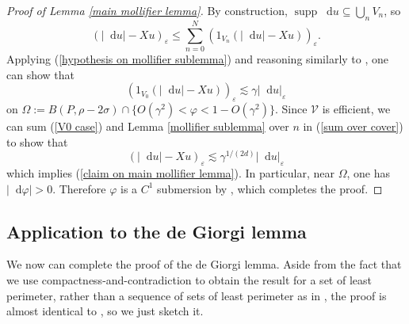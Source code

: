 \documentclass[reqno,11pt]{amsart}
\DeclareMathOperator{\supp}{supp}
\newcommand*\dif{\mathop{}\!\mathrm{d}}
\theoremstyle{definition}
\numberwithin{equation}{section}
\begin{document}
\begin{proof}[Proof of Lemma \ref{main mollifier lemma}]
By construction, $\supp \dif u \subseteq \bigcup_n V_n$, so
\begin{equation}\label{sum over cover}
(|\dif u| - X u)_\varepsilon \leq \sum_{n = 0}^N (1_{V_n} (|\dif u| - Xu))_\varepsilon.
\end{equation}
Applying (\ref{hypothesis on mollifier sublemma}) and reasoning similarly to \cite[pg92]{Giusti77}, one can show that
\begin{equation}\label{V0 case}
    (1_{V_0} (|\dif u| - Xu))_\varepsilon \lesssim \gamma |\dif u|_\varepsilon
\end{equation}
on $\Omega := B(P, \rho - 2\sigma) \cap \{O(\gamma^2) < \varphi < 1 - O(\gamma^2)\}$.
Since $\mathcal V$ is efficient, we can sum (\ref{V0 case}) and Lemma \ref{mollifier sublemma} over $n$ in (\ref{sum over cover}) to show that
$$(|\dif u| - Xu)_\varepsilon \lesssim \gamma^{1/(2d)} |\dif u|_\varepsilon$$
which implies (\ref{claim on main mollifier lemma}).
In particular, near $\Omega$, one has $|\dif \varphi| > 0$.
Therefore $\varphi$ is a $C^1$ submersion by \cite[Lemma 7.1]{Giusti77}, which completes the proof.
\end{proof}

\subsection{Application to the de Giorgi lemma}
We now can complete the proof of the de Giorgi lemma.
Aside from the fact that we use compactness-and-contradiction to obtain the result for a set of least perimeter, rather than a sequence of sets of least perimeter as in \cite{Giusti77, Miranda66}, the proof is almost identical to \cite[Lemma 7.5]{Giusti77}, so we just sketch it.
\end{document}
